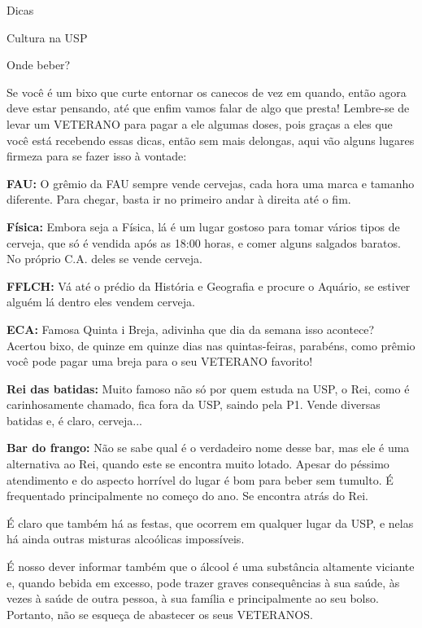 \begin{secao}{Dicas}
\begin{subsecao}{Cultura na USP}
\end{subsecao}

\begin{subsecao}{Onde beber?}

Se você é um bixo que curte entornar os canecos de vez em quando, então agora
deve estar pensando, até que enfim vamos falar de algo que presta! Lembre-se de
levar um VETERANO para pagar a ele algumas doses, pois graças a eles que você
está recebendo essas dicas, então sem mais delongas, aqui vão alguns lugares
firmeza para se fazer isso à vontade:

{\bf FAU:} O grêmio da FAU sempre vende cervejas, cada hora uma marca e tamanho diferente. Para chegar, basta ir no primeiro andar à direita até o fim.

{\bf Física:} Embora seja a Física, lá é um lugar gostoso para tomar vários
tipos de cerveja, que só é vendida após as 18:00 horas, e comer alguns
salgados baratos. No próprio C.A. deles se vende cerveja.

{\bf FFLCH:} Vá até o prédio da História e Geografia e procure o Aquário, se estiver alguém lá dentro eles vendem cerveja.

{\bf ECA:} Famosa Quinta i Breja, adivinha que dia da semana isso acontece?
Acertou bixo, de quinze em quinze dias nas quintas-feiras, parabéns, como
prêmio você pode pagar uma breja para o seu VETERANO favorito!

{\bf Rei das batidas:} Muito famoso não só por quem estuda na USP, o Rei,
como é carinhosamente chamado, fica fora da USP, saindo pela P1. Vende
diversas batidas e, é claro, cerveja...

{\bf Bar do frango:} Não se sabe qual é o verdadeiro nome desse bar, mas ele é
uma alternativa ao Rei, quando este se encontra muito lotado. Apesar do péssimo atendimento e do aspecto horrível do lugar é bom para beber sem
tumulto. É frequentado principalmente no começo do ano. Se encontra atrás do
Rei.

É claro que também há as festas, que ocorrem em qualquer lugar da USP, e nelas
há ainda outras misturas alcoólicas impossíveis.

É nosso dever informar também que o álcool é uma substância altamente viciante
e, quando bebida em excesso, pode trazer graves consequências à sua saúde, às
vezes à saúde de outra pessoa, à sua família e principalmente ao seu bolso.
Portanto, não se esqueça de abastecer os seus VETERANOS.

\end{subsecao}
\end{secao}
